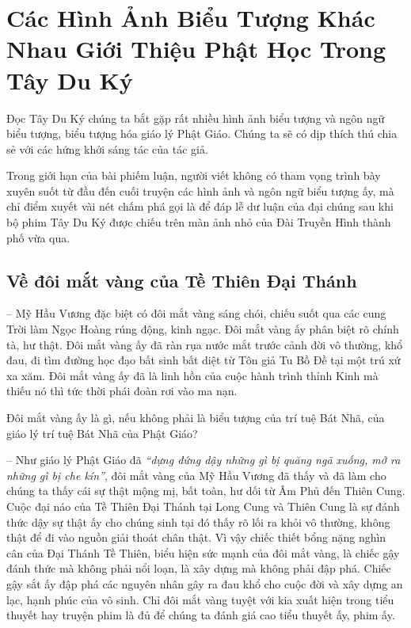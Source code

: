 \chapter{Các Hình Ảnh Biểu Tượng Khác Nhau Giới Thiệu Phật Học Trong Tây Du Ký} %
\label{cha:cac_hinh_anh_bieu_tuong_khac_nhau_gioi_thieu_phat_hoc_trong_tay_du_ky}

Đọc Tây Du Ký chúng ta bắt gặp rất nhiều hình ảnh biểu tượng và ngôn ngữ biểu tượng, biểu tượng hóa giáo lý Phật Giáo. Chúng ta sẽ có dịp thích thú chia sẻ với các hứng khởi sáng tác của tác giả.

Trong giới hạn của bài phiếm luận, người viết không có tham vọng trình bày xuyên suốt từ đầu đến cuối truyện các hình ảnh và ngôn ngữ biểu tượng ấy, mà chỉ điểm xuyết vài nét chấm phá gọi là để đáp lễ dư luận của đại chúng sau khi bộ phim Tây Du Ký được chiếu trên màn ảnh nhỏ của Đài Truyền Hình thành phố vừa qua.

\section{Về đôi mắt vàng của Tề Thiên Đại Thánh} %
\label{sec:ve_doi_mat_vang_cua_te_thien}

-- Mỹ Hầu Vương đặc biệt có đôi mắt vàng sáng chói, chiếu suốt qua các cung Trời làm Ngọc Hoàng rúng động, kinh ngạc. Đôi mắt vàng ấy phân biệt rõ chính tà, hư thật. Đôi mắt vàng ấy đã ràn rụa nước mắt trước cảnh đời vô thường, khổ đau, đi tìm đường học đạo bất sinh bất diệt từ Tôn giả Tu Bồ Đề tại một trú xứ xa xăm. Đôi mắt vàng ấy đã là linh hồn của cuộc hành trình thỉnh Kinh mà thiếu nó thì tức thời phái đoàn rơi vào ma nạn.

Đôi mắt vàng ấy là gì, nếu không phải là biểu tượng của trí tuệ Bát Nhã, của giáo lý trí tuệ Bát Nhã của Phật Giáo?

-- Như giáo lý Phật Giáo đã \emph{``dựng đứng dậy những gì bị quăng ngã xuống, mở ra những gì bị che kín''}, đôi mắt vàng của Mỹ Hầu Vương đã thấy và đã làm cho chúng ta thấy cái sự thật mộng mị, bất toàn, hư dối từ Âm Phủ đến Thiên Cung. Cuộc đại náo của Tề Thiên Đại Thánh tại Long Cung và Thiên Cung là sự đánh thức dậy sự thật ấy cho chúng sinh tại đó thấy rõ lối ra khỏi vô thường, không thật để đi vào nguồn giải thoát chân thật. Vì vậy chiếc thiết bổng nặng nghìn cân của Đại Thánh Tề Thiên, biểu hiện sức mạnh của đôi mắt vàng, là chiếc gậy đánh thức mà không phải nổi loạn, là xây dựng mà không phải đập phá. Chiếc gậy sắt ấy đập phá các nguyên nhân gây ra đau khổ cho cuộc đời và xây dựng an lạc, hạnh phúc của vô sinh. Chỉ đôi mắt vàng tuyệt với kia xuất hiện trong tiểu thuyết hay truyện phim là đủ để chúng ta đánh giá cao tiểu thuyết ấy, phim ấy.

